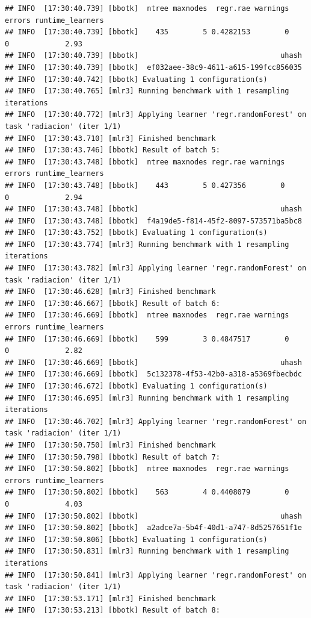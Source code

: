 \documentclass[
  11pt,
  a4paper,
]{article}
\begin{document}
\begin{verbatim}
## INFO  [17:30:40.739] [bbotk]  ntree maxnodes  regr.rae warnings errors runtime_learners
## INFO  [17:30:40.739] [bbotk]    435        5 0.4282153        0      0             2.93
## INFO  [17:30:40.739] [bbotk]                                 uhash
## INFO  [17:30:40.739] [bbotk]  ef032aee-38c9-4611-a615-199fcc856035
## INFO  [17:30:40.742] [bbotk] Evaluating 1 configuration(s)
## INFO  [17:30:40.765] [mlr3] Running benchmark with 1 resampling iterations
## INFO  [17:30:40.772] [mlr3] Applying learner 'regr.randomForest' on task 'radiacion' (iter 1/1)
## INFO  [17:30:43.710] [mlr3] Finished benchmark
## INFO  [17:30:43.746] [bbotk] Result of batch 5:
## INFO  [17:30:43.748] [bbotk]  ntree maxnodes regr.rae warnings errors runtime_learners
## INFO  [17:30:43.748] [bbotk]    443        5 0.427356        0      0             2.94
## INFO  [17:30:43.748] [bbotk]                                 uhash
## INFO  [17:30:43.748] [bbotk]  f4a19de5-f814-45f2-8097-573571ba5bc8
## INFO  [17:30:43.752] [bbotk] Evaluating 1 configuration(s)
## INFO  [17:30:43.774] [mlr3] Running benchmark with 1 resampling iterations
## INFO  [17:30:43.782] [mlr3] Applying learner 'regr.randomForest' on task 'radiacion' (iter 1/1)
## INFO  [17:30:46.628] [mlr3] Finished benchmark
## INFO  [17:30:46.667] [bbotk] Result of batch 6:
## INFO  [17:30:46.669] [bbotk]  ntree maxnodes  regr.rae warnings errors runtime_learners
## INFO  [17:30:46.669] [bbotk]    599        3 0.4847517        0      0             2.82
## INFO  [17:30:46.669] [bbotk]                                 uhash
## INFO  [17:30:46.669] [bbotk]  5c132378-4f53-42b0-a318-a5369fbecbdc
## INFO  [17:30:46.672] [bbotk] Evaluating 1 configuration(s)
## INFO  [17:30:46.695] [mlr3] Running benchmark with 1 resampling iterations
## INFO  [17:30:46.702] [mlr3] Applying learner 'regr.randomForest' on task 'radiacion' (iter 1/1)
## INFO  [17:30:50.750] [mlr3] Finished benchmark
## INFO  [17:30:50.798] [bbotk] Result of batch 7:
## INFO  [17:30:50.802] [bbotk]  ntree maxnodes  regr.rae warnings errors runtime_learners
## INFO  [17:30:50.802] [bbotk]    563        4 0.4408079        0      0             4.03
## INFO  [17:30:50.802] [bbotk]                                 uhash
## INFO  [17:30:50.802] [bbotk]  a2adce7a-5b4f-40d1-a747-8d5257651f1e
## INFO  [17:30:50.806] [bbotk] Evaluating 1 configuration(s)
## INFO  [17:30:50.831] [mlr3] Running benchmark with 1 resampling iterations
## INFO  [17:30:50.841] [mlr3] Applying learner 'regr.randomForest' on task 'radiacion' (iter 1/1)
## INFO  [17:30:53.171] [mlr3] Finished benchmark
## INFO  [17:30:53.213] [bbotk] Result of batch 8:

\end{verbatim}
\end{document}
